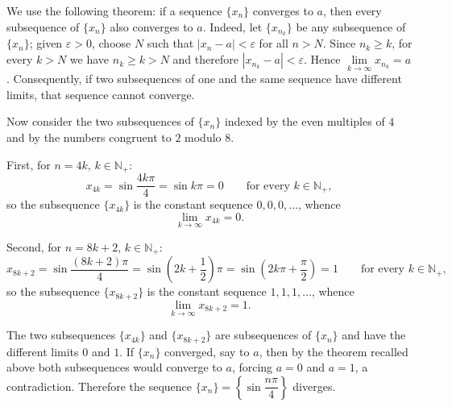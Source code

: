 \documentclass[11pt,a4paper]{article}
\newenvironment{solution}[1]{%
  \par\addvspace{1.7ex}%
  \noindent{\color{solutioncolor}\textbf{#1}}\hspace{0.55em}\ignorespaces}%
  {\par\addvspace{0.9ex}}
\begin{document}
\begin{solution}{Solution 2.1.25}\label{es:2.1.25}
We use the following theorem: if a sequence $\{x_n\}$ converges to $a$, then every
subsequence of $\{x_n\}$ also converges to $a$. Indeed, let $\{x_{n_k}\}$ be any
subsequence of $\{x_n\}$; given $\varepsilon>0$, choose $N$ such that
$|x_n-a|<\varepsilon$ for all $n>N$. Since $n_k\ge k$, for every $k>N$ we have
$n_k\ge k>N$ and therefore $|x_{n_k}-a|<\varepsilon$. Hence
$\lim\limits_{k\to\infty}x_{n_k}=a$. Consequently, if two subsequences of one and the
same sequence have different limits, that sequence cannot converge.

Now consider the two subsequences of $\{x_n\}$ indexed by the even multiples of $4$
and by the numbers congruent to $2$ modulo $8$.

First, for $n=4k$, $k\in\mathbb{N}_+$:
\[
x_{4k}=\sin\frac{4k\pi}{4}=\sin k\pi=0
\qquad\text{for every } k\in\mathbb{N}_+,
\]
so the subsequence $\{x_{4k}\}$ is the constant sequence $0,0,0,\dots$, whence
\[
\lim_{k\to\infty}x_{4k}=0 .
\]

Second, for $n=8k+2$, $k\in\mathbb{N}_+$:
\[
x_{8k+2}=\sin\frac{(8k+2)\pi}{4}=\sin\left(2k+\frac12\right)\pi
=\sin\left(2k\pi+\frac{\pi}{2}\right)=1
\qquad\text{for every } k\in\mathbb{N}_+,
\]
so the subsequence $\{x_{8k+2}\}$ is the constant sequence $1,1,1,\dots$, whence
\[
\lim_{k\to\infty}x_{8k+2}=1 .
\]

The two subsequences $\{x_{4k}\}$ and $\{x_{8k+2}\}$ are subsequences of $\{x_n\}$ and
have the different limits $0$ and $1$. If $\{x_n\}$ converged, say to $a$, then by the
theorem recalled above both subsequences would converge to $a$, forcing $a=0$ and
$a=1$, a contradiction. Therefore the sequence
$\{x_n\}=\left\{\sin\dfrac{n\pi}{4}\right\}$ diverges.
\end{solution}
\end{document}
